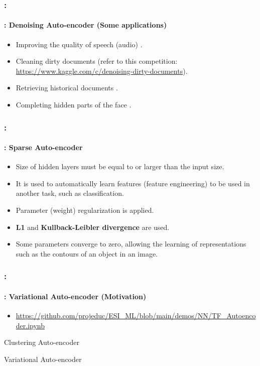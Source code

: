 \documentclass[xcolor=table]{beamer}
\begin{document}
\begin{frame}
	\frametitle{\insertshortsubtitle: \insertsection}
	\framesubtitle{\insertsubsection: Denoising Auto-encoder (Some applications)}
	
	\begin{itemize}
		\item Improving the quality of speech (audio) \cite{2013-lu}.
		\item Cleaning dirty documents (refer to this competition: \url{https://www.kaggle.com/c/denoising-dirty-documents}).
		\item Retrieving historical documents \cite{2019-neji}.
		\item Completing hidden parts of the face \cite{2017-li-al}.
	\end{itemize}

\end{frame}

\begin{frame}
	\frametitle{\insertshortsubtitle: \insertsection}
	\framesubtitle{\insertsubsection: Sparse Auto-encoder}
	
	\begin{itemize}
		\item Size of hidden layers must be equal to or larger than the input size.
		\item It is used to automatically learn features (feature engineering) to be used in another task, such as classification.
		\item Parameter (weight) regularization is applied.
		\item \textbf{L1} and \textbf{Kullback-Leibler divergence} are used.
		\item Some parameters converge to zero, allowing the learning of representations such as the contours of an object in an image.
	\end{itemize}

\end{frame}

\begin{frame}
	\frametitle{\insertshortsubtitle: \insertsection}
	\framesubtitle{\insertsubsection: Variational Auto-encoder (Motivation)}
	
	\begin{itemize}
		\item {\scriptsize\url{https://github.com/projeduc/ESI_ML/blob/main/demos/NN/TF_Autoencoder.ipynb}}
	\end{itemize}
	
	\begin{minipage}{0.47\textwidth} 
		\begin{center}
			Clustering Auto-encoder
		\end{center}\vskip-6pt
	\end{minipage}
	\begin{minipage}{0.47\textwidth}
		\begin{center}
			Variational Auto-encoder
		\end{center}\vskip-6pt
	\end{minipage}
	
\end{frame}
\end{document}
